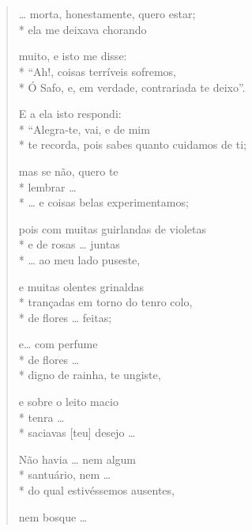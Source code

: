 \section*{}
\begin{verse}
\ldots{} morta, honestamente, quero estar;\\*
ela me deixava chorando

muito, e isto me disse:\\*
``Ah!, coisas terríveis sofremos,\\*
Ó Safo, e, em verdade, contrariada te deixo''.

E a ela isto respondi:\\*
``Alegra-te, vai, e de mim\\*
te recorda, pois sabes quanto cuidamos de ti;

mas se não, quero te\\*
lembrar \ldots{}\\*
\ldots{} e coisas belas experimentamos;

pois com muitas guirlandas de violetas\\*
e de rosas \ldots{} juntas\\*
\ldots{} ao meu lado puseste,			

e muitas olentes grinaldas\\*
trançadas em torno do tenro colo, \\*
de flores \ldots{} feitas;

e\ldots{} com perfume\\*
de flores \ldots{}\\*
digno de rainha, te ungiste,

e sobre o leito macio\\*
tenra \ldots{}\\*
saciavas [teu] desejo \ldots{}

Não havia \ldots{} nem algum\\*
santuário, nem \ldots{}\\*
do qual estivéssemos ausentes,

nem bosque \ldots{}
\end{verse}

\medskip

